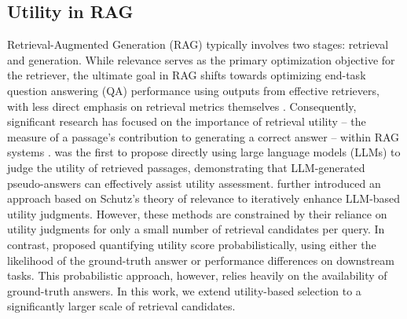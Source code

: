 \subsection{Utility in RAG}
Retrieval-Augmented Generation (RAG) typically involves two stages: retrieval and generation. While relevance serves as the primary optimization objective for the retriever, the ultimate goal in RAG shifts towards optimizing end-task question answering (QA) performance using outputs from effective retrievers, with less direct emphasis on retrieval metrics themselves \cite{zhang2025leveraging}. Consequently, significant research has focused on the importance of retrieval utility – the measure of a passage's contribution to generating a correct answer – within RAG systems \cite{zhang2024iterative, zhang2025leveraging, zhang2024large, shi2023replug, izacard2023atlas}. \citet{zhang2024large} was the first to propose directly using large language models (LLMs) to judge the utility of retrieved passages, demonstrating that LLM-generated pseudo-answers can effectively assist utility assessment. \citet{zhang2024iterative} further introduced an approach based on Schutz's theory of relevance to iteratively enhance LLM-based utility judgments. However, these methods are constrained by their reliance on utility judgments for only a small number of retrieval candidates per query. 
In contrast, \citet{shi2023replug} proposed quantifying utility score probabilistically, using either the likelihood of the ground-truth answer or performance differences on downstream tasks. This probabilistic approach, however, relies heavily on the availability of ground-truth answers. 
In this work, we extend utility-based selection to a significantly larger scale of retrieval candidates.


